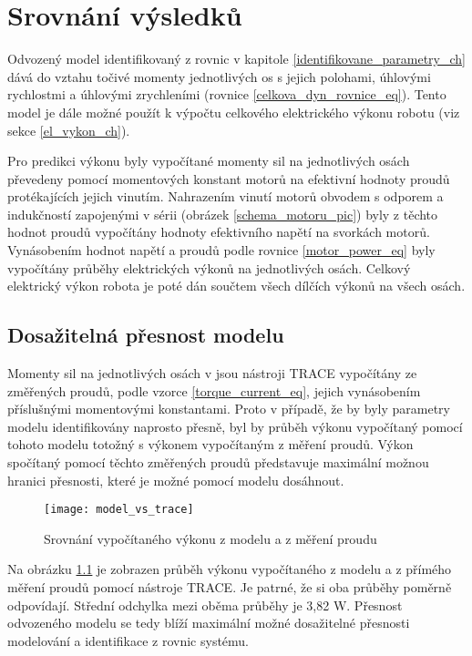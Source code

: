 \chapter{Srovnání výsledků}

Odvozený model identifikovaný z rovnic v kapitole \ref{identifikovane_parametry_ch} dává do vztahu točivé momenty jednotlivých os s jejich polohami, úhlovými rychlostmi a úhlovými zrychleními (rovnice \ref{celkova_dyn_rovnice_eq}). Tento model je dále možné použít k výpočtu celkového elektrického výkonu robotu (viz sekce \ref{el_vykon_ch}).

Pro predikci výkonu byly vypočítané momenty sil na jednotlivých osách převedeny pomocí momentových konstant motorů na efektivní hodnoty proudů protékajících jejich vinutím. Nahrazením vinutí motorů obvodem s odporem a indukčností zapojenými v sérii (obrázek \ref{schema_motoru_pic}) byly z těchto hodnot proudů vypočítány hodnoty efektivního napětí na svorkách motorů. Vynásobením hodnot napětí a proudů podle rovnice \ref{motor_power_eq} byly vypočítány průběhy elektrických výkonů na jednotlivých osách. Celkový elektrický výkon robota je poté dán součtem všech dílčích výkonů na všech osách. 

\section{Dosažitelná přesnost modelu}
\label{dosaz_presnost_sec}
Momenty sil na jednotlivých osách v jsou nástroji TRACE vypočítány ze změřených proudů, podle vzorce \ref{torque_current_eq}, jejich vynásobením příslušnými momentovými konstantami. Proto v případě, že by byly parametry modelu identifikovány naprosto přesně, byl by průběh výkonu vypočítaný pomocí tohoto modelu totožný s výkonem vypočítaným z měření proudů. Výkon spočítaný pomocí těchto změřených proudů představuje maximální možnou hranici přesnosti, které je možné pomocí modelu dosáhnout. 

\begin{figure}[h!]
\texttt{[image: model\_vs\_trace]}
\caption{Srovnání vypočítaného výkonu z modelu a z měření proudu}
\label{model_vs_trace_pic}
\end{figure}

Na obrázku \ref{model_vs_trace_pic} je zobrazen průběh výkonu vypočítaného z modelu a z přímého měření proudů pomocí nástroje TRACE. Je patrné, že si oba průběhy poměrně odpovídají. Střední odchylka mezi oběma průběhy je 3,82 W. Přesnost odvozeného modelu se tedy blíží maximální možné dosažitelné přesnosti modelování a identifikace z rovnic systému.

